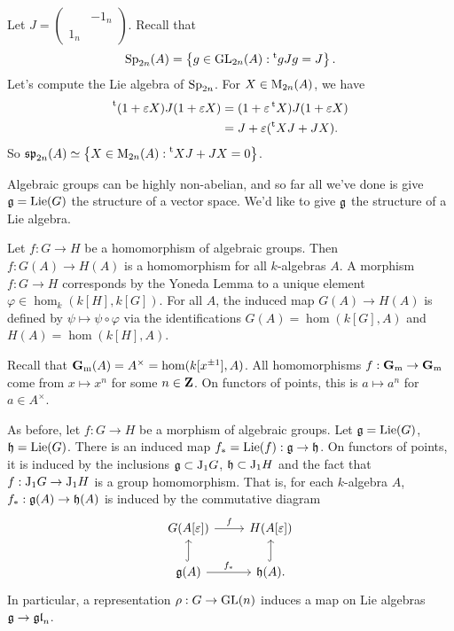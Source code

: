 \begin{example}[Symplectic]
Let $J=\begin{pmatrix} & -1_n \\ 1_n \end{pmatrix}$. Recall that 
\[
  \operatorname{Sp}_{2n}(A) = \left\{g\in \operatorname{GL}_{2n}(A) : \prescript{\mathrm{t}}{}{g} J g=J\right\} .
\]
Let's compute the Lie algebra of $\operatorname{Sp}_{2n}$. For $X\in \operatorname{M}_{2n}(A)$, we 
have 
\begin{align*}
  \prescript{\mathrm{t}}{}{(1+\varepsilon X)} J (1+\varepsilon X) 
    &= (1+\varepsilon\prescript{\mathrm{t}}{}{X}) J (1+\varepsilon X) \\
    &= J+\varepsilon(\prescript{\mathrm{t}}{}{X} J+J X) .
\end{align*}
So 
$\mathfrak{sp}_{2n}(A) \simeq \left\{X\in \operatorname{M}_{2n}(A):\prescript{\mathrm{t}}{}{X} J+J X = 0\right\}$. 
\end{example}

Algebraic groups can be highly non-abelian, and so far all we've done is give 
$\mathfrak{g}=\operatorname{Lie}(G)$ the structure of a vector space. We'd like to give $\mathfrak{g}$ the 
structure of a Lie algebra. 

Let $f:G\to H$ be a homomorphism of algebraic groups. Then $f:G(A)\to H(A)$ is 
a homomorphism for all $k$-algebras $A$. A morphism $f:G\to H$ corresponds 
by the Yoneda Lemma to a unique element $\varphi\in \hom_k(k[H],k[G])$. For all 
$A$, the induced map $G(A)\to H(A)$ is defined by 
$\psi\mapsto \psi\circ\varphi$ via the identifications 
$G(A)=\hom(k[G],A)$ and $H(A)=\hom(k[H],A)$. 

\begin{example}
Recall that $\mathbf{G}_\mathrm{m}(A)=A^\times = \hom(k[x^{\pm 1}], A)$. All homomorphisms 
$f:\mathbf{G}_\mathrm{m}\to \mathbf{G}_\mathrm{m}$ come from $x\mapsto x^n$ for some $n\in \mathbf{Z}$. On functors of 
points, this is $a\mapsto a^n$ for $a\in A^\times$. 
\end{example}

As before, let $f:G\to H$ be a morphism of algebraic groups. Let 
$\mathfrak{g}=\operatorname{Lie}(G)$, $\mathfrak{h}=\operatorname{Lie}(G)$. There is an induced map 
$f_\ast=\operatorname{Lie}(f):\mathfrak{g}\to \mathfrak{h}$. On functors of points, it is induced by the 
inclusions $\mathfrak{g}\subset \mathrm{J}_1 G$, $\mathfrak{h}\subset \mathrm{J}_1 H$ and the fact that 
$f:\mathrm{J}_1 G\to \mathrm{J}_1 H$ is a group homomorphism. That is, for each 
$k$-algebra $A$, $f_\ast:\mathfrak{g}(A)\to \mathfrak{h}(A)$ is induced by the commutative 
diagram 
\[\begin{tikzcd}
  G(A[\varepsilon]) \ar[r, "f"] 
    & H(A[\varepsilon]) \\
  \fg(A) \ar[r, "f_\ast"] \ar[u, hook] 
    & \fh(A). \ar[u, hook]
\end{tikzcd}\]
In particular, a representation $\rho:G\to \operatorname{GL}(n)$ induces a map on 
Lie algebras $\mathfrak{g}\to \mathfrak{gl}_n$. 

